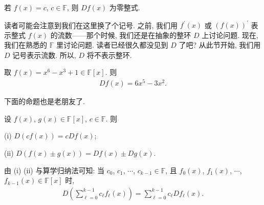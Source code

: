 \begin{remark}
    若 $f(x) = c$, $c \in \mathbb{F}$, 则 $Df(x)$ 为零整式.
\end{remark}

\begin{remark}
    读者可能会注意到我们在这里换了个记号. 之前, 我们用 $f^{\prime} (x)$ 或 $(f(x))^{\prime}$ 表示整式 $f(x)$ 的流数——那个时候, 我们还是在抽象的整环 $D$ 上讨论问题. 现在, 我们在熟悉的 $\mathbb{F}$ 里讨论问题. 读者已经很久都没见到 $D$ 了吧? 从此节开始, 我们用 $D$ 记号表示流数. 所以, $D$ 将不表示整环.
\end{remark}

\begin{example}
    取 $f(x) = x^6 - x^3 + 1 \in \mathbb{F}[x]$. 则
    \begin{align*}
        Df(x) = 6x^5 - 3x^2.
    \end{align*}
\end{example}

下面的命题也是老朋友了.

\begin{proposition}
    设 $f(x)$, $g(x) \in \mathbb{F}[x]$, $c \in \mathbb{F}$. 则

    (i) $D(cf(x)) = c Df(x)$;

    (ii) $D(f(x) \pm g(x)) = Df(x) \pm Dg(x)$.

    由 (i) (ii) 与算学归纳法可知: 当 $c_0$, $c_1$, $\cdots$, $c_{k-1} \in \mathbb{F}$, 且 $f_0 (x)$, $f_1 (x)$, $\cdots$, $f_{k-1} (x) \in \mathbb{F}[x]$ 时,
    \begin{align*}
        D \left( \sum_{\ell = 0}^{k-1} c_\ell f_\ell (x) \right) = \sum_{\ell = 0}^{k-1} c_\ell Df_\ell (x).
    \end{align*}
\end{proposition}

